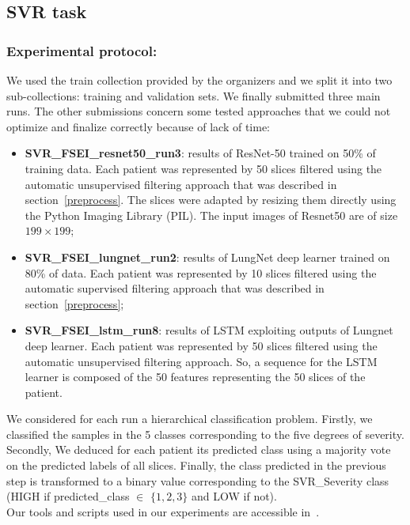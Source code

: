 \documentclass{llncs}
\begin{document}
\subsection{SVR task}
\subsubsection{Experimental protocol:}

We used the train collection provided by the organizers and we split it into two sub-collections: training and validation sets. We finally submitted three main runs. The other submissions concern some tested approaches that we could not optimize and finalize correctly because of lack of time:
\begin{itemize}
\item \textbf{SVR\_FSEI\_resnet50\_run3}: results of ResNet-50 trained on 50\% of training data. Each patient was represented by 50 slices filtered using the automatic unsupervised filtering approach that was described in section~\ref{preprocess}. The slices were adapted by resizing them directly using the Python Imaging Library (PIL). The input images of Resnet50 are of size $199\times199$;
\item \textbf{SVR\_FSEI\_lungnet\_run2}: results of LungNet deep learner trained on 80\% of data. Each patient was represented by 10 slices filtered using the automatic supervised filtering approach that was described in section~\ref{preprocess};
\item \textbf{SVR\_FSEI\_lstm\_run8}: results of LSTM exploiting outputs of Lungnet deep learner. Each patient was represented by 50 slices filtered using the automatic unsupervised filtering approach. So, a sequence for the LSTM learner is composed of the 50 features representing the 50 slices of the patient.
\end{itemize}

We considered for each run a hierarchical classification problem. Firstly, we classified the samples in the 5 classes corresponding to the five degrees of severity. Secondly, We deduced for each patient its predicted class using a majority vote on the predicted labels of all slices. Finally, the class predicted in the previous step is transformed to a binary value corresponding to the SVR\_Severity class (HIGH if predicted\_class $\in$ $\{1,2,3\}$ and LOW if not).\\

Our tools and scripts used in our experiments are accessible in~\cite{anouargit}.
\end{document}
